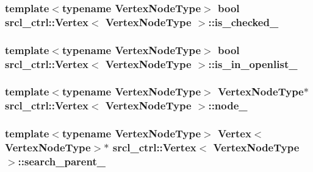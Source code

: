 \hypertarget{classsrcl__ctrl_1_1Vertex_a0df1a1732482d5a18a255c8295ec47db}{
\subsubsection[{is\-\_\-checked\-\_\-}]{\setlength{\rightskip}{0pt plus 5cm}template$<$typename Vertex\-Node\-Type$>$ bool {\bf srcl\-\_\-ctrl\-::\-Vertex}$<$ Vertex\-Node\-Type $>$\-::is\-\_\-checked\-\_\-}}\label{classsrcl__ctrl_1_1Vertex_a0df1a1732482d5a18a255c8295ec47db}
\hypertarget{classsrcl__ctrl_1_1Vertex_a903aae6844c345082211eef308df0237}{
\subsubsection[{is\-\_\-in\-\_\-openlist\-\_\-}]{\setlength{\rightskip}{0pt plus 5cm}template$<$typename Vertex\-Node\-Type$>$ bool {\bf srcl\-\_\-ctrl\-::\-Vertex}$<$ Vertex\-Node\-Type $>$\-::is\-\_\-in\-\_\-openlist\-\_\-}}\label{classsrcl__ctrl_1_1Vertex_a903aae6844c345082211eef308df0237}
\hypertarget{classsrcl__ctrl_1_1Vertex_a8f6a4fe4b4f90da09585d217a45776c0}{
\subsubsection[{node\-\_\-}]{\setlength{\rightskip}{0pt plus 5cm}template$<$typename Vertex\-Node\-Type$>$ Vertex\-Node\-Type$\ast$ {\bf srcl\-\_\-ctrl\-::\-Vertex}$<$ Vertex\-Node\-Type $>$\-::node\-\_\-}}\label{classsrcl__ctrl_1_1Vertex_a8f6a4fe4b4f90da09585d217a45776c0}
\hypertarget{classsrcl__ctrl_1_1Vertex_a24423a829a6b5b22a16778c4d3e560fd}{
\subsubsection[{search\-\_\-parent\-\_\-}]{\setlength{\rightskip}{0pt plus 5cm}template$<$typename Vertex\-Node\-Type$>$ {\bf Vertex}$<$Vertex\-Node\-Type$>$$\ast$ {\bf srcl\-\_\-ctrl\-::\-Vertex}$<$ Vertex\-Node\-Type $>$\-::search\-\_\-parent\-\_\-}}\label{classsrcl__ctrl_1_1Vertex_a24423a829a6b5b22a16778c4d3e560fd}
